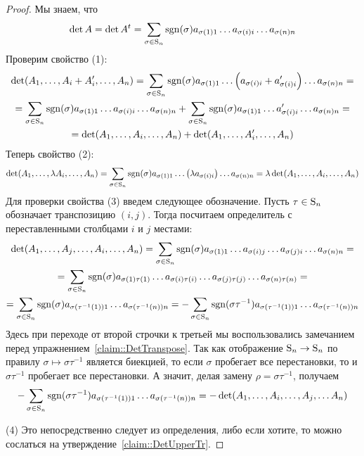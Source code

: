 \begin{proof}
Мы знаем, что 
\[
\det A = \det A^t = \sum_{\sigma\in\operatorname{S}_{n}}\operatorname{sgn}(\sigma)a_{\sigma(1)1} \ldots a_{\sigma(i)i}\ldots a_{\sigma(n)n}
\]
Проверим свойство (1):
\begin{gather*}
\det(A_1,\ldots, A_i + A_i', \ldots, A_n) = \sum_{\sigma\in\operatorname{S}_{n}}\operatorname{sgn}(\sigma)a_{\sigma(1)1} \ldots \left(a_{\sigma(i)i} + a_{\sigma(i)i}'\right)\ldots a_{\sigma(n)n}=\\
= \sum_{\sigma\in\operatorname{S}_{n}}\operatorname{sgn}(\sigma)a_{\sigma(1)1} \ldots a_{\sigma(i)i}\ldots a_{\sigma(n)n} +\sum_{\sigma\in\operatorname{S}_{n}}\operatorname{sgn}(\sigma)a_{\sigma(1)1} \ldots a_{\sigma(i)i}'\ldots a_{\sigma(n)n} =\\
= \det(A_1,\ldots, A_i, \ldots, A_n) + \det(A_1,\ldots,A_i', \ldots, A_n)
\end{gather*}
Теперь свойство (2):
\[
\det(A_1,\ldots, \lambda A_i, \ldots, A_n) = \sum_{\sigma\in\operatorname{S}_{n}}\operatorname{sgn}(\sigma)a_{\sigma(1)1} \ldots \left(\lambda a_{\sigma(i)i}\right)\ldots a_{\sigma(n)n}= \lambda \det(A_1,\ldots,  A_i, \ldots, A_n) 
\]
Для проверки свойства (3) введем следующее обозначение. Пусть $\tau\in\operatorname{S}_{n}$ обозначает транспозицию $(i,j)$. Тогда посчитаем определитель с переставленными столбцами $i$ и $j$ местами:
\begin{gather*}
\det (A_1,\ldots, A_j, \ldots, A_i, \ldots, A_n) = \sum_{\sigma\in\operatorname{S}_{n}}\operatorname{sgn}(\sigma) a_{\sigma(1)1}\ldots a_{\sigma(i)j}\ldots a_{\sigma(j)i}\ldots a_{\sigma(n)n} = \\
=  \sum_{\sigma\in\operatorname{S}_{n}}\operatorname{sgn}(\sigma) a_{\sigma(1)\tau(1)}\ldots a_{\sigma(i)\tau(i)}\ldots a_{\sigma(j)\tau(j)}\ldots a_{\sigma(n)\tau(n)} = \\
= \sum_{\sigma\in\operatorname{S}_{n}} \operatorname{sgn}(\sigma) a_{\sigma(\tau^{-1}(1))1} \ldots a_{\sigma(\tau^{-1}(n))n} = -\sum_{\sigma\in\operatorname{S}_{n}} \operatorname{sgn}(\sigma\tau^{-1}) a_{\sigma(\tau^{-1}(1))1} \ldots a_{\sigma(\tau^{-1}(n))n}
\end{gather*}
Здесь при переходе от второй строчки к третьей мы воспользовались замечанием перед упражнением~\ref{claim::DetTranspose}. Так как отображение $\operatorname{S}_{n}\to \operatorname{S}_{n}$ по правилу $\sigma\mapsto \sigma \tau^{-1}$ является биекцией, то если $\sigma$ пробегает все перестановки, то и $\sigma\tau^{-1}$ пробегает все перестановки. А значит, делая замену $\rho = \sigma \tau^{-1}$, получаем
\[
-\sum_{\sigma\in\operatorname{S}_{n}} \operatorname{sgn}(\sigma\tau^{-1}) a_{\sigma(\tau^{-1}(1))1} \ldots a_{\sigma(\tau^{-1}(n))n} = -\det (A_1,\ldots, A_i, \ldots, A_j,\ldots A_n)
\]

(4) Это непосредственно следует из определения, либо если хотите, то можно сослаться на утверждение~\ref{claim::DetUpperTr}.
\end{proof}

